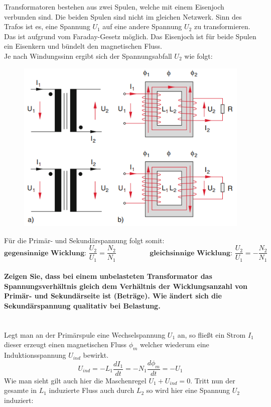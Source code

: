 \documentclass[a4paper, 11pt, ngerman, parskip=half-]{scrartcl}
\newcommand{\myparagraph}[1]{\paragraph{#1}\mbox{}\\}
\begin{document}
Transformatoren bestehen aus zwei Spulen, welche mit einem Eisenjoch verbunden sind. Die beiden Spulen sind nicht im gleichen Netzwerk.
Sinn des Trafos ist es, eine Spannung $U_1$ auf eine andere Spannung $U_2$ zu transformieren. Das ist aufgrund vom Faraday-Gesetz möglich. Das Eisenjoch ist für beide Spulen
ein Eisenkern und bündelt den magnetischen Fluss. \\
Je nach Windungssinn ergibt sich der Spannungsabfall $U_2$ wie folgt:
\begin{figure}[H]
    \centering
    \includegraphics[]{image/11/Trafo_Aufbau.png}
\end{figure}
Für die Primär- und Sekundärspannung folgt somit:
\begin{equation}
    \textbf{gegensinnige Wicklung: } \frac{U_2}{U_1} = \frac{N_2}{N_1} \hspace{2cm} \textbf{gleichsinnige Wicklung: } \frac{U_2}{U_1} = - \frac{N_2}{N_1}
\end{equation}
\myparagraph{Zeigen Sie, dass bei einem unbelasteten Transformator das Spannungsverhältnis gleich dem
    Verhältnis der Wicklungsanzahl von Primär- und Sekundärseite ist (Beträge). Wie ändert sich die
    Sekundärspannung qualitativ bei Belastung.}
Legt man an der Primärspule eine Wechselspannung $U_1$ an, so fließt ein Strom $I_1$ dieser erzeugt einen magnetischen Fluss $\phi_m$ welcher wiederum eine Induktionsspannung
$U_{ind}$ bewirkt.
\[U_{ind} = - L_1 \frac{d I_1}{d t} = -N_1 \frac{d \phi_m}{d t} = -U_1\]
Wie man sieht gilt auch hier die Maschenregel $U_1 + U_{ind} = 0$.
Tritt nun der gesamte in $L_1$ induzierte Fluss auch durch $L_2$ so wird hier eine Spannung $U_2$ induziert:
\end{document}
